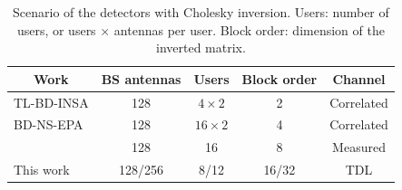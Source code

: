 \begin{table}[htbp]
\centering
\caption[Scenario of the detectors with Cholesky inversion.]{Scenario of the detectors with Cholesky inversion. Users: number of users, or users $\times$ antennas per user. Block order: dimension of the inverted matrix.}
\label{tab:hw_cholesky_cenario}
\vspace{4pt}
\footnotesize
\renewcommand{\arraystretch}{1.15}
\setlength{\tabcolsep}{6pt}
\begin{tabular}{lcccc}
\hline
\multicolumn{1}{c}{\textbf{Work}} & \textbf{BS antennas} & \textbf{Users} & \textbf{Block order} & \textbf{Channel} \\
\hline
TL-BD-INSA & 128 & $4 \times 2$ & 2 & Correlated \\
\hline
BD-NS-EPA & 128 & $16 \times 2$ & 4 & Correlated \\
\hline
\cite{gangarajaiah2017cholesky} & 128 & 16 & 8 & Measured \\
\hline
This work & 128/256 & 8/12 & 16/32 & TDL \\
\hline
\end{tabular}
\vspace{4pt}
\end{table}

